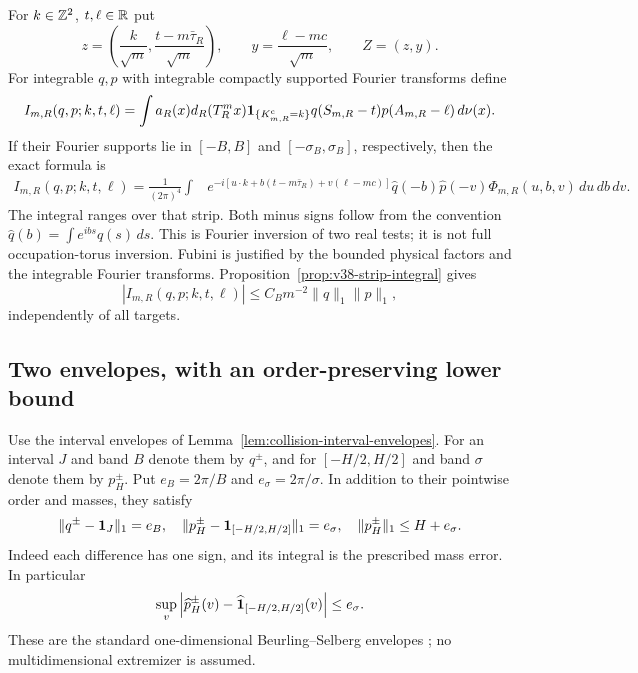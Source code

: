 For $k\in\mathbb Z^2$, $t,\ell\in\mathbb R$ put
\begin{equation}\label{eq:v38-central-coordinates}
 z=\left(\frac{k}{\sqrt m},\frac{t-m\bar\tau_R}{\sqrt m}\right),
 \qquad y=\frac{\ell-mc}{\sqrt m},\qquad Z=(z,y).
\end{equation}
For integrable $q,p$ with integrable compactly supported Fourier
transforms define
\[
 I_{m,R}(q,p;k,t,\ell)=\int a_R(x)d_R(T_R^mx)
 \mathbf1_{\{K^{\rm c}_{m,R}=k\}}q(S_{m,R}-t)p(A_{m,R}-\ell)\,d\nu(x).
\]
If their Fourier supports lie in $[-B,B]$ and
$[-\sigma_B,\sigma_B]$, respectively, then the exact formula is
\begin{align}\label{eq:v38-double-test-inverse}
 I_{m,R}(q,p;k,t,\ell)
 =\frac1{(2\pi)^4}\int
 &e^{-i[u\cdot k+b(t-m\bar\tau_R)+v(\ell-mc)]}
 \widehat q(-b)\widehat p(-v)\Phi_{m,R}(u,b,v)\,du\,db\,dv.
\end{align}
The integral ranges over that strip. Both minus signs follow from the
convention $\widehat q(b)=\int e^{ibs}q(s)\,ds$. This is Fourier
inversion of two real tests; it is not full occupation-torus inversion.
Fubini is justified by the bounded physical factors and the integrable
Fourier transforms. Proposition~\ref{prop:v38-strip-integral} gives
\begin{equation}\label{eq:v38-double-test-bound}
 |I_{m,R}(q,p;k,t,\ell)|
       \le C_Bm^{-2}\|q\|_1\|p\|_1,
\end{equation}
independently of all targets.

\subsection{Two envelopes, with an order-preserving lower bound}
Use the interval envelopes of
Lemma~\ref{lem:collision-interval-envelopes}. For an interval $J$ and
band $B$ denote them by $q^\pm$, and for $[-H/2,H/2]$ and band
$\sigma$ denote them by $p_H^\pm$. Put
$e_B=2\pi/B$ and $e_\sigma=2\pi/\sigma$. In addition to their
pointwise order and masses, they satisfy
\begin{equation}\label{eq:v38-envelope-L1}
 \|q^\pm-\one_J\|_1=e_B,\quad
 \|p_H^\pm-\one_{[-H/2,H/2]}\|_1=e_\sigma,\quad
 \|p_H^\pm\|_1\le H+e_\sigma.
\end{equation}
Indeed each difference has one sign, and its integral is the prescribed
mass error. In particular
\begin{equation}\label{eq:v38-envelope-Fourier}
 \sup_v\left|\widehat p_H^\pm(v)
       -\widehat{\one}_{[-H/2,H/2]}(v)\right|\le e_\sigma.
\end{equation}
These are the standard one-dimensional Beurling--Selberg envelopes
\cite[Introduction]{CVExt}; no multidimensional extremizer is assumed.

